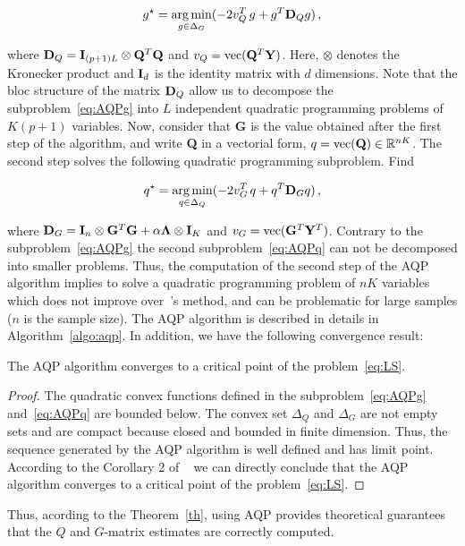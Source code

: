 \begin{equation}
\begin{aligned}
g^\star = \underset{g \in \Delta_G}{\arg \min}  ( -2  v^T_Q \, g + g^T {\bf D}_Q g ) \, ,  
\end{aligned}
\label{eq:AQPg}
\end{equation}

\noindent where ${\bf D}_Q = {\bf I}_{(p+1)L} \otimes {\bf Q}^T {\bf Q}$ and $v_Q = {\rm vec}({\bf Q}^T {\bf Y})$. Here, $\otimes$ denotes the Kronecker product and ${\bf I}_d$ is the identity matrix with $d$ dimensions. Note that the bloc structure of the matrix ${\bf D}_Q$ allow us to decompose the subproblem~\eqref{eq:AQPg} into $L$ independent quadratic programming problems of $K(p + 1)$ variables. Now, consider that {\bf G} is the value obtained after the first step of the algorithm, and write {\bf Q} in a vectorial form, $q = {\rm vec({\bf Q})} \in \mathbb{R}^{nK}$. The second step solves the following quadratic programming subproblem. Find

\begin{equation}
\begin{aligned}
q^\star = \underset{q \in \Delta_Q}{\arg \min} ( -2 v^T_G \, q + q^T {\bf D}_G q ) \,  ,
\end{aligned}
\label{eq:AQPq}
\end{equation}

\noindent where ${\bf D}_G = {\bf I}_{n} \otimes {\bf G}^T {\bf G } + \alpha {\bf \Lambda}  \otimes {\bf I}_K$ and $v_G = {\rm vec}({\bf G}^T{\bf  Y}^T)$. Contrary to the subproblem~\eqref{eq:AQPg} the second subproblem~\eqref{eq:AQPq} can not be decomposed into smaller problems. Thus, the computation of the second step of the AQP algorithm implies to solve a quadratic programming problem of $nK$ variables which does not improve over~\cite{Caye2016}'s method, and can be problematic for large samples ($n$ is the sample size). 
The AQP algorithm is described in details in Algorithm~\ref{algo:aqp}. In addition, we have the following convergence result:
\begin{thm}
\label{th}
	The AQP algorithm converges to a critical point of the problem~\eqref{eq:LS}.
\end{thm}
\begin{proof}
The quadratic convex functions defined in the subproblem~\eqref{eq:AQPg} and~\eqref{eq:AQPq} are bounded below. The convex set $\Delta_Q$ and $\Delta_G$ are not empty sets and are compact because closed and bounded in finite dimension. Thus, the sequence generated by the AQP algorithm is well defined and has limit point.
According to the Corollary 2 of ~\cite{Grippo2000} we can directly conclude that
the AQP algorithm converges to a critical point of the problem~\eqref{eq:LS}.
\end{proof}
Thus, acording to the Theorem~\ref{th}, using AQP provides theoretical guarantees that the $Q$ and $G$-matrix estimates are correctly computed.

